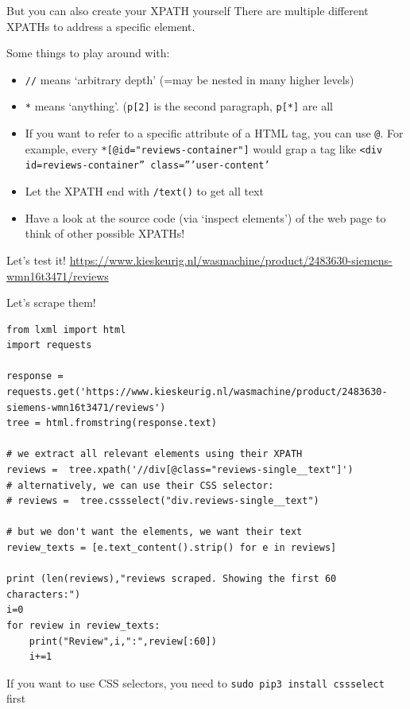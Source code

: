 \documentclass{beamer}
\begin{document}
\begin{frame}{But you can also create your XPATH yourself}
There are multiple different XPATHs to address a specific element.

Some things to play around with:
\begin{itemize}
\item<1-> \texttt{//} means `arbitrary depth' (=may be nested in many higher levels)
\item<2->  \texttt{*} means `anything'. (\texttt{p[2]} is the second paragraph, \texttt{p[*]} are all
\item<3-> If you want to refer to a specific attribute of a HTML tag, you can use \texttt{@}. For example, every \texttt{*[@id="reviews-container"]} would grap a tag like \texttt{<div id=reviews-container'' class='''user-content'}
\item<4->  Let the XPATH end with \texttt{/text()} to get all text
\item<5->  Have a look at the source code (via `inspect elements') of the web page to think of other possible XPATHs!
\end{itemize}
\end{frame}



\begin{frame}{Let's test it!}
	\large{\url{https://www.kieskeurig.nl/wasmachine/product/2483630-siemens-wmn16t3471/reviews}}
\end{frame}


\begin{frame}[fragile]{Let's scrape them!}
\begin{lstlisting}
from lxml import html
import requests

response = requests.get('https://www.kieskeurig.nl/wasmachine/product/2483630-siemens-wmn16t3471/reviews')
tree = html.fromstring(response.text)

# we extract all relevant elements using their XPATH
reviews =  tree.xpath('//div[@class="reviews-single__text"]')
# alternatively, we can use their CSS selector:
# reviews =  tree.cssselect("div.reviews-single__text")

# but we don't want the elements, we want their text
review_texts = [e.text_content().strip() for e in reviews]

print (len(reviews),"reviews scraped. Showing the first 60 characters:")
i=0
for review in review_texts:
    print("Review",i,":",review[:60])
    i+=1
\end{lstlisting}
\tiny{If you want to use CSS selectors, you need to \texttt{sudo pip3 install cssselect} first}
\end{frame}
\end{document}
